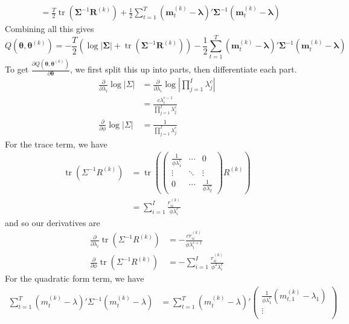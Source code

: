 \documentclass[letterpaper,10pt]{amsart}
\newcommand{\tr}{\operatorname{tr}}
\begin{document}
\begin{enumerate}[{1}.1]
\begin{align*}
&= \frac{T}{2}\tr\left(\boldsymbol \Sigma^{-1} \boldsymbol R^{(k)}\right) + \frac{1}{2}\sum_{t=1}^T (\boldsymbol m_t^{(k)} - \boldsymbol \lambda)'\boldsymbol \Sigma^{-1}(\boldsymbol m_t^{(k)} - \boldsymbol \lambda)
\end{align*}
Combining all this gives
\[Q(\boldsymbol \theta, \boldsymbol \theta^{(k)}) = -\frac{T}{2}\left(\log |\boldsymbol \Sigma| + \tr\left(\boldsymbol \Sigma^{-1} \boldsymbol R^{(k)}\right)\right) - \frac{1}{2}\sum_{t=1}^T  (\boldsymbol m_t^{(k)} - \boldsymbol \lambda)'\boldsymbol \Sigma^{-1}(\boldsymbol m_t^{(k)} - \boldsymbol \lambda)\]
To get $\frac{\partial Q(\boldsymbol \theta, \boldsymbol \theta^{(k)})}{\partial \boldsymbol \theta}$, we first split this up into parts, then differentiate each part. 
\begin{align*}
\frac{\partial}{\partial \lambda_i} \log |\Sigma| &=\frac{\partial}{\partial \lambda_i} \log \left| \prod_{j=1}^I \lambda_j^c \right|\\
&= \frac{c \lambda_i^{c-1}}{\prod_{j=1}^I \lambda_j^c}\\
\frac{\partial}{\partial \phi} \log | \Sigma| &= \frac{1}{\prod_{j=1}^I \lambda_j^c}
\end{align*}
For the trace term, we have
\begin{align*}
\tr(\Sigma^{-1} R^{(k)}) &= \tr \left(\begin{pmatrix}
\frac{1}{\phi \lambda_1^c} & \cdots & 0\\
\vdots & \ddots & \vdots\\
0 & \cdots & \frac{1}{\phi \lambda_I^c}
\end{pmatrix} R^{(k)} \right)\\
&= \sum_{i=1}^I  \frac{r_{ii}^{(k)}}{\phi \lambda_i^c}
\end{align*}
and so our derivatives are
\begin{align*}
\frac{\partial}{\partial \lambda_i} \tr(\Sigma^{-1} R^{(k)}) &= -\frac{cr_{ii}^{(k)}}{\phi \lambda_i^{c+1}}\\
\frac{\partial}{\partial \phi} \tr(\Sigma^{-1} R^{(k)}) &= - \sum_{i=1}^I \frac{r_{ii}^{(k)}}{\phi^2 \lambda_i^c}
\end{align*}
For the quadratic form term, we have
\begin{align*}
\sum_{t=1}^T (m_t^{(k)} - \lambda)' \Sigma^{-1}  (m_t^{(k)} - \lambda) &= \sum_{t=1}^T  (m_t^{(k)} - \lambda)' \begin{pmatrix}
\frac{1}{\phi \lambda_1^c}  (m_{t,1}^{(k)} - \lambda_1)\\
\vdots \\

\end{pmatrix}
\end{align*}
\end{enumerate}
\end{document}
